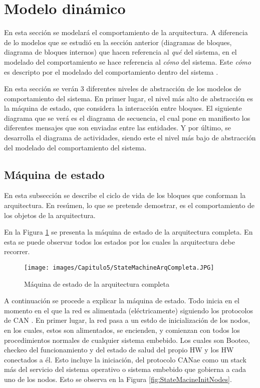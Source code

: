 \section{Modelo dinámico}
En esta sección se modelará el comportamiento de la arquitectura.
A diferencia de lo modelos  que se estudió en la sección anterior (diagramas
de bloques, diagrama de bloques internos) que hacen referencia al
\textit{qué} del sistema, en el modelado del comportamiento se
hace referencia al \textit{cómo} del sistema. Este \textit{cómo}
es descripto por el modelado del comportamiento dentro del
sistema \citep{HoltPery}.

En esta sección se verán  3 diferentes niveles de abstracción
de los modelos de comportamiento del sistema. En primer lugar, el
nivel más alto de abstracción es la máquina de estado, que considera la
interacción entre bloques. El siguiente diagrama que se verá es
el diagrama de secuencia, el cual pone en manifiesto los diferentes
mensajes que son enviadas entre las entidades. Y por último, se
desarrolla el diagrama de actividades, siendo este el nivel
más bajo de abstracción del modelado del comportamiento del sistema.

\subsection{Máquina de estado}
En esta subsección se describe el ciclo de vida de los
bloques que conforman la arquitectura. En resúmen, lo que se
pretende demostrar, es el comportamiento de los objetos de la
arquitectura.

En la Figura \ref{fig:StateMachineArqCompleta} se presenta la
máquina de estado de la arquitectura completa.  En esta se
puede observar todos los estados por los cuales la arquitectura
debe recorrer.

\begin{figure}[h!]
 \centering
 \texttt{[image: images/Capitulo5/StateMachineArqCompleta.JPG]}
  \caption{Máquina de estado de la arquitectura completa}
\label{fig:StateMachineArqCompleta}
\end{figure}

A continuación se procede a explicar la máquina de estado. Todo
inicia en el momento en el que la red es alimentada (eléctricamente)
siguiendo los protocolos de CAN \citep{can-ciaWEB}. En primer lugar, la
red pasa a un estdo de inicialización de los nodos, en los cuales, estos
son alimentados, se encienden, y comienzan con todos los procedimientos
normales de cualquier sistema embebido. Los cuales son Booteo, checkeo del
funcionamiento y del estado de salud del propio \ac{HW} y los \ac{HW}
conectados a él. Esto incluye la iniciación, del protocolo CANae como
un stack más del servicio del sistema operativo o sistema embebido
que gobierna a cada uno de los nodos. Esto se observa en la Figura
\ref{fig:StateMacineInitNodes}.

